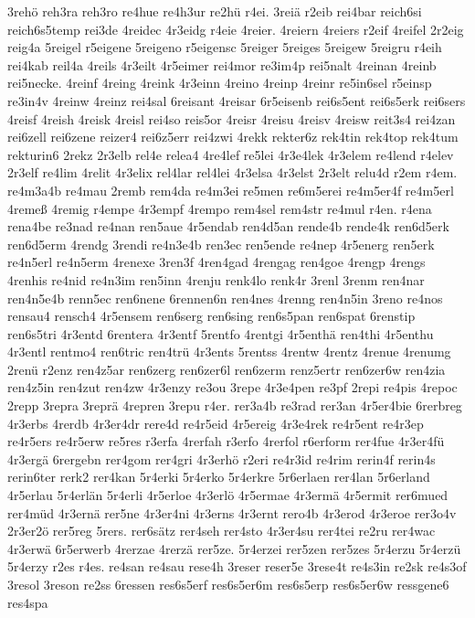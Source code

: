 {3rehö
reh3ra
reh3ro
re4hue
re4h3ur
re2hü
r4ei.
3reiä
r2eib
rei4bar
reich6si
reich6s5temp
rei3de
4reidec
4r3eidg
r4eie
4reier.
4reiern
4reiers
r2eif
4reifel
2r2eig
reig4a
5reigel
r5eigene
5reigeno
r5eigensc
5reiger
5reiges
5reigew
5reigru
r4eih
rei4kab
reil4a
4reils
4r3eilt
4r5eimer
rei4mor
re3im4p
rei5nalt
4reinan
4reinb
rei5necke.
4reinf
4reing
4reink
4r3einn
4reino
4reinp
4reinr
re5in6sel
r5einsp
re3in4v
4reinw
4reinz
rei4sal
6reisant
4reisar
6r5eisenb
rei6s5ent
rei6s5erk
rei6sers
4reisf
4reish
4reisk
4reisl
rei4so
reis5or
4reisr
4reisu
4reisv
4reisw
reit3s4
rei4zan
rei6zell
rei6zene
reizer4
rei6z5err
rei4zwi
4rekk
rekter6z
rek4tin
rek4top
rek4tum
rekturin6
2rekz
2r3elb
rel4e
relea4
4re4lef
re5lei
4r3e4lek
4r3elem
re4lend
r4elev
2r3elf
re4lim
4relit
4r3elix
rel4lar
rel4lei
4r3elsa
4r3elst
2r3elt
relu4d
r2em
r4em.
re4m3a4b
re4mau
2remb
rem4da
re4m3ei
re5men
re6m5erei
re4m5er4f
re4m5erl
4remeß
4remig
r4empe
4r3empf
4rempo
rem4sel
rem4str
re4mul
r4en.
r4ena
rena4be
re3nad
re4nan
ren5aue
4r5endab
ren4d5an
rende4b
rende4k
ren6d5erk
ren6d5erm
4rendg
3rendi
re4n3e4b
ren3ec
ren5ende
re4nep
4r5energ
ren5erk
re4n5erl
re4n5erm
4renexe
3ren3f
4ren4gad
4rengag
ren4goe
4rengp
4rengs
4renhis
re4nid
re4n3im
ren5inn
4renju
renk4lo
renk4r
3renl
3renm
ren4nar
ren4n5e4b
renn5ec
ren6nene
6rennen6n
ren4nes
4renng
ren4n5in
3reno
re4nos
rensau4
rensch4
4r5ensem
ren6serg
ren6sing
ren6s5pan
ren6spat
6renstip
ren6s5tri
4r3entd
6rentera
4r3entf
5rentfo
4rentgi
4r5enthä
ren4thi
4r5enthu
4r3entl
rentmo4
ren6tric
ren4trü
4r3ents
5rentss
4rentw
4rentz
4renue
4renumg
2renü
r2enz
ren4z5ar
ren6zerg
ren6zer6l
ren6zerm
renz5ertr
ren6zer6w
ren4zia
ren4z5in
ren4zut
ren4zw
4r3enzy
re3ou
3repe
4r3e4pen
re3pf
2repi
re4pis
4repoc
2repp
3repra
3reprä
4repren
3repu
r4er.
rer3a4b
re3rad
rer3an
4r5er4bie
6rerbreg
4r3erbs
4rerdb
4r3er4dr
rere4d
re4r5eid
4r5ereig
4r3e4rek
re4r5ent
re4r3ep
re4r5ers
re4r5erw
re5res
r3erfa
4rerfah
r3erfo
4rerfol
r6erform
rer4fue
4r3er4fü
4r3ergä
6rergebn
rer4gom
rer4gri
4r3erhö
r2eri
re4r3id
re4rim
rerin4f
rerin4s
rerin6ter
rerk2
rer4kan
5r4erki
5r4erko
5r4erkre
5r6erlaen
rer4lan
5r6erland
4r5erlau
5r4erlän
5r4erli
4r5erloe
4r3erlö
4r5ermae
4r3ermä
4r5ermit
rer6mued
rer4müd
4r3ernä
rer5ne
4r3er4ni
4r3erns
4r3ernt
rero4b
4r3erod
4r3eroe
rer3o4v
2r3er2ö
rer5reg
5rers.
rer6sätz
rer4seh
rer4sto
4r3er4su
rer4tei
re2ru
rer4wac
4r3erwä
6r5erwerb
4rerzae
4rerzä
rer5ze.
5r4erzei
rer5zen
rer5zes
5r4erzu
5r4erzü
5r4erzy
r2es
r4es.
re4san
re4sau
rese4h
3reser
reser5e
3rese4t
re4s3in
re2sk
re4s3of
3resol
3reson
re2ss
6ressen
res6s5erf
res6s5er6m
res6s5erp
res6s5er6w
ressgene6
res4spa
}
